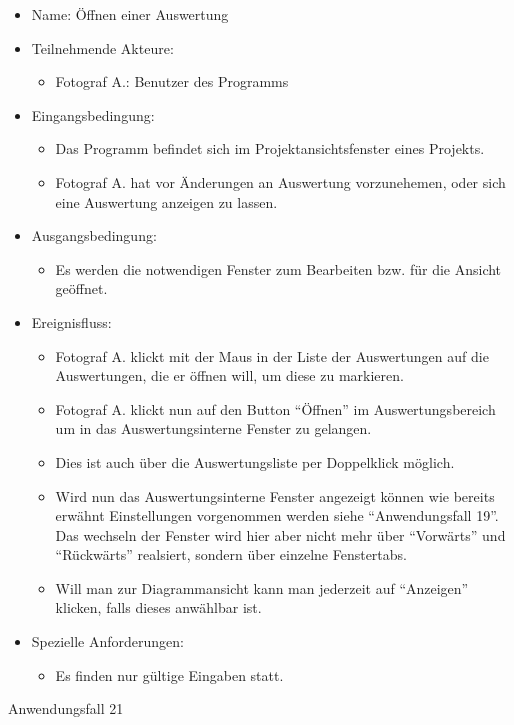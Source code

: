\begin{itemize}
\item Name: Öffnen einer Auswertung
\item Teilnehmende Akteure:
\begin{itemize}
\item Fotograf A.: Benutzer des Programms
\end{itemize}
\item Eingangsbedingung:
\begin{itemize}
\item Das Programm befindet sich im Projektansichtsfenster eines Projekts.
\item Fotograf A. hat vor Änderungen an Auswertung vorzunehemen, oder sich eine Auswertung anzeigen zu lassen.
\end{itemize}
\item Ausgangsbedingung:
\begin{itemize}
\item Es werden die notwendigen Fenster zum Bearbeiten bzw. für die Ansicht geöffnet.
\end{itemize}
\item Ereignisfluss:
\begin{itemize}
\item Fotograf A. klickt mit der Maus in der Liste der Auswertungen auf die Auswertungen, die er öffnen will, um diese zu markieren.
\item Fotograf A. klickt nun auf den Button "`Öffnen"' im Auswertungsbereich um in das Auswertungsinterne Fenster zu gelangen.
\item Dies ist auch über die Auswertungsliste per Doppelklick möglich.
\item Wird nun das Auswertungsinterne Fenster angezeigt können wie bereits erwähnt Einstellungen vorgenommen werden siehe "`Anwendungsfall 19"'. Das wechseln der Fenster wird hier aber nicht mehr über "`Vorwärts"' und "`Rückwärts"' realsiert, sondern über einzelne Fenstertabs.
\item Will man zur Diagrammansicht kann man jederzeit auf "`Anzeigen"' klicken, falls dieses anwählbar ist.
\end{itemize}
\item Spezielle Anforderungen:
\begin{itemize}
\item Es finden nur gültige Eingaben statt.
\end{itemize}
\end{itemize}
 
\begin{description}
\item[Anwendungsfall 21]
\end{description}
 
